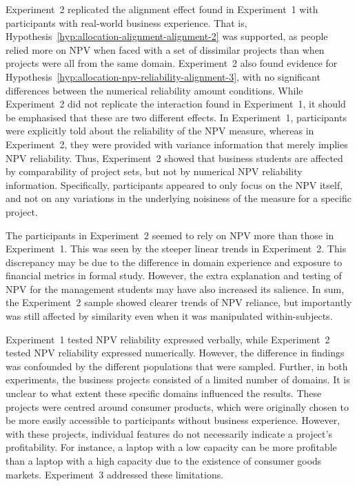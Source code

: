 \documentclass[a4paper, nobind, dvipsnames]{templates/ociamthesis}
\theoremstyle{definition}
\theoremstyle{definition}
\theoremstyle{definition}
\theoremstyle{definition}
\theoremstyle{remark}
\begin{document}
Experiment~2 replicated the alignment effect found in Experiment~1 with
participants with real-world business experience. That is,
Hypothesis~\ref{hyp:allocation-alignment-alignment-2} was supported, as people
relied more on NPV when faced with a set of dissimilar projects than when
projects were all from the same domain. Experiment~2 also found evidence for
Hypothesis~\ref{hyp:allocation-npv-reliability-alignment-3}, with no
significant differences between the numerical reliability amount conditions.
While Experiment~2 did not replicate the interaction found in Experiment~1, it
should be emphasised that these are two different effects. In Experiment~1,
participants were explicitly told about the reliability of the NPV measure,
whereas in Experiment~2, they were provided with variance information that
merely implies NPV reliability. Thus, Experiment~2 showed that business students
are affected by comparability of project sets, but not by numerical NPV
reliability information. Specifically, participants appeared to only focus on
the NPV itself, and not on any variations in the underlying noisiness of the
measure for a specific project.

The participants in Experiment~2 seemed to rely on NPV more than those in
Experiment~1. This was seen by the steeper linear trends in Experiment~2. This
discrepancy may be due to the difference in domain experience and exposure to
financial metrics in formal study. However, the extra explanation and testing of
NPV for the management students may have also increased its salience. In sum,
the Experiment~2 sample showed clearer trends of NPV reliance, but importantly
was still affected by similarity even when it was manipulated within-subjects.

Experiment~1 tested NPV reliability expressed verbally, while Experiment~2
tested NPV reliability expressed numerically. However, the difference in
findings was confounded by the different populations that were sampled. Further,
in both experiments, the business projects consisted of a limited number of
domains. It is unclear to what extent these specific domains influenced the
results. These projects were centred around consumer products, which were
originally chosen to be more easily accessible to participants without business
experience. However, with these projects, individual features do not necessarily
indicate a project's profitability. For instance, a laptop with a low capacity
can be more profitable than a laptop with a high capacity due to the existence
of consumer goods markets. Experiment~3 addressed these limitations.
\end{document}
